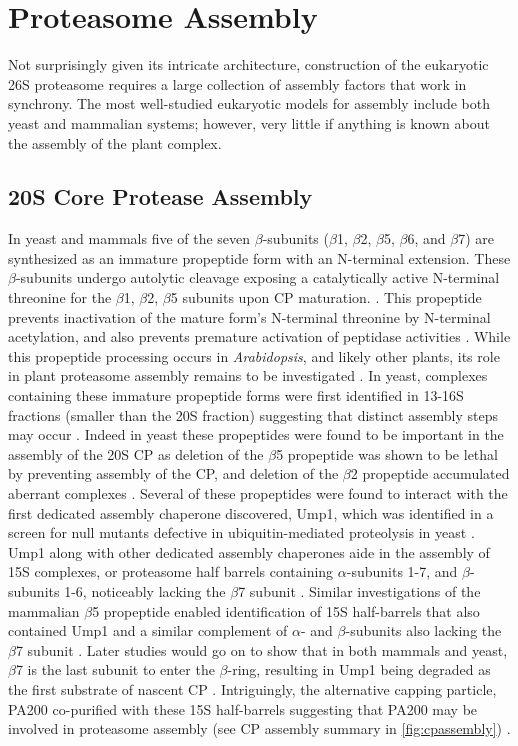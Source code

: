 \section{Proteasome Assembly}
	Not surprisingly given its intricate architecture, construction of the eukaryotic 26S proteasome requires a large collection of assembly factors that work in synchrony. The most well-studied eukaryotic models for assembly include both yeast and mammalian systems; however, very little if anything is known about the assembly of the plant complex.

\subsection{20S Core Protease Assembly}
	 In yeast and mammals five of the seven $\beta$-subunits ($\beta$1, $\beta$2, $\beta$5, $\beta$6, and $\beta$7) are synthesized as an immature propeptide form with an N-terminal extension. These $\beta$-subunits undergo autolytic cleavage exposing a catalytically active N-terminal threonine for the $\beta$1, $\beta$2, $\beta$5 subunits upon CP maturation.  \citep{gu14, lee90}. This propeptide prevents inactivation of the mature form’s N-terminal threonine by N-terminal acetylation, and also prevents premature activation of peptidase activities \citep{arendt99, arendt97}. While this propeptide processing occurs in \textit{Arabidopsis}, and likely other plants, its role in plant proteasome assembly remains to be investigated \citep{book10}. In yeast, complexes containing these immature propeptide forms were first identified in 13-16S fractions (smaller than the 20S fraction) suggesting that distinct assembly steps may occur \citep{frentzel94}. Indeed in yeast these propeptides were found to be important in the assembly of the 20S CP as deletion of the $\beta$5 propeptide was shown to be lethal by preventing assembly of the CP, and deletion of the $\beta$2 propeptide accumulated aberrant complexes \citep{jager99}. Several of these propeptides were found to interact with the first dedicated assembly chaperone discovered, Ump1, which was identified in a screen for null mutants defective in ubiquitin-mediated proteolysis in yeast \citep{li07, ramos98}. Ump1 along with other dedicated assembly chaperones aide in the assembly of 15S complexes, or proteasome half barrels containing $\alpha$-subunits 1-7, and $\beta$-subunits 1-6, noticeably lacking the $\beta$7 subunit \citep{li07, marques07}. Similar investigations of the mammalian $\beta$5 propeptide enabled identification of 15S half-barrels that also contained Ump1 and a similar complement of $\alpha$- and $\beta$-subunits also lacking the $\beta$7 subunit \citep{witt00}. Later studies would go on to show that in both mammals and yeast, $\beta$7 is the last subunit to enter the $\beta$-ring, resulting in Ump1 being degraded as the first substrate of nascent CP \citep{hirano08, ramos98}. Intriguingly, the alternative capping particle, PA200 co-purified with these 15S half-barrels suggesting that PA200 may be involved in proteasome assembly (see CP assembly summary in \ref{fig:cpassembly}) \citep{li07, marques07}. 

